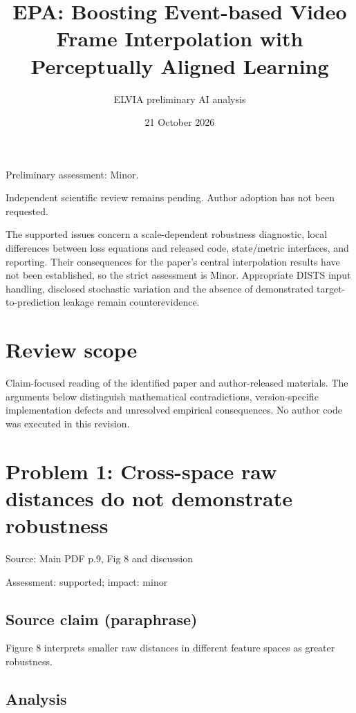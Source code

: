 \documentclass[11pt]{article}
\begin{document}
\title{EPA: Boosting Event-based Video Frame Interpolation with Perceptually Aligned Learning}

\author{ELVIA preliminary AI analysis}\date{21 October 2026}\maketitle

Preliminary assessment: Minor.\par

Independent scientific review remains pending. Author adoption has not been requested.

The supported issues concern a scale-dependent robustness diagnostic, local differences between loss equations and released code, state/metric interfaces, and reporting. Their consequences for the paper's central interpolation results have not been established, so the strict assessment is Minor. Appropriate DISTS input handling, disclosed stochastic variation and the absence of demonstrated target-to-prediction leakage remain counterevidence.

\section*{Review scope}

Claim-focused reading of the identified paper and author-released materials. The arguments below distinguish mathematical contradictions, version-specific implementation defects and unresolved empirical consequences. No author code was executed in this revision.

\section*{Problem 1: Cross-space raw distances do not demonstrate robustness}

Source: Main PDF p.9, Fig 8 and discussion

Assessment: supported; impact: minor

\subsection*{Source claim (paraphrase)}

Figure 8 interprets smaller raw distances in different feature spaces as greater robustness.

\subsection*{Analysis}
\end{document}
